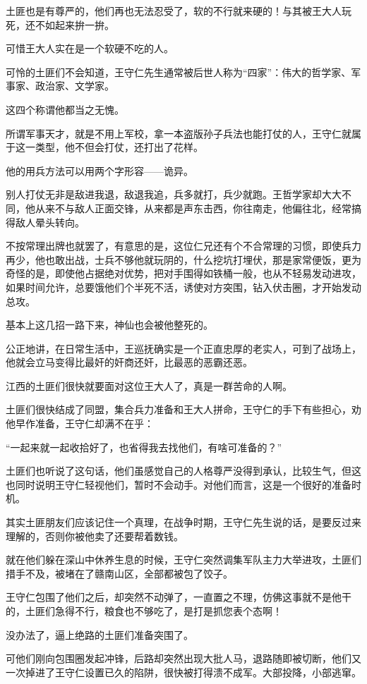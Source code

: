 \begin{multicols}{\theparacolNo}
		土匪也是有尊严的，他们再也无法忍受了，软的不行就来硬的！与其被王大人玩死，还不如起来拚一拚。

		可惜王大人实在是一个软硬不吃的人。

		可怜的土匪们不会知道，王守仁先生通常被后世人称为“四家”：伟大的哲学家、军事家、政治家、文学家。

		这四个称谓他都当之无愧。

		所谓军事天才，就是不用上军校，拿一本盗版孙子兵法也能打仗的人，王守仁就属于这一类型，他不但会打仗，还打出了花样。

		他的用兵方法可以用两个字形容——诡异。

		别人打仗无非是敌进我退，敌退我追，兵多就打，兵少就跑。王哲学家却大大不同，他从来不与敌人正面交锋，从来都是声东击西，你往南走，他偏往北，经常搞得敌人晕头转向。

		不按常理出牌也就罢了，有意思的是，这位仁兄还有个不合常理的习惯，即使兵力再少，他也敢出战，士兵不够他就玩阴的，什么挖坑打埋伏，那是家常便饭，更为奇怪的是，即使他占据绝对优势，把对手围得如铁桶一般，也从不轻易发动进攻，如果时间允许，总要饿他们个半死不活，诱使对方突围，钻入伏击圈，才开始发动总攻。

		基本上这几招一路下来，神仙也会被他整死的。

		公正地讲，在日常生活中，王巡抚确实是一个正直忠厚的老实人，可到了战场上，他就会立马变得比最奸的奸商还奸，比最恶的恶霸还恶。

		江西的土匪们很快就要面对这位王大人了，真是一群苦命的人啊。

		土匪们很快结成了同盟，集合兵力准备和王大人拼命，王守仁的手下有些担心，劝他早作准备，王守仁却满不在乎：

		“一起来就一起收拾好了，也省得我去找他们，有啥可准备的？”

		土匪们也听说了这句话，他们虽感觉自己的人格尊严没得到承认，比较生气，但这也同时说明王守仁轻视他们，暂时不会动手。对他们而言，这是一个很好的准备时机。

		其实土匪朋友们应该记住一个真理，在战争时期，王守仁先生说的话，是要反过来理解的，否则你被他卖了还要帮着数钱。

		就在他们躲在深山中休养生息的时候，王守仁突然调集军队主力大举进攻，土匪们措手不及，被堵在了赣南山区，全部都被包了饺子。

		王守仁包围了他们之后，却突然不动弹了，一直置之不理，仿佛这事就不是他干的，土匪们急得不行，粮食也不够吃了，是打是抓您表个态啊！

		没办法了，逼上绝路的土匪们准备突围了。

		可他们刚向包围圈发起冲锋，后路却突然出现大批人马，退路随即被切断，他们又一次掉进了王守仁设置已久的陷阱，很快被打得溃不成军。大部投降，小部逃窜。


\end{multicols}
